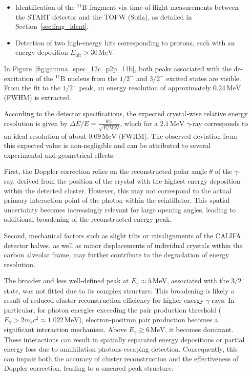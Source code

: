 \begin{itemize}
  \item Identification of the $^{11}\mathrm{B}$ fragment via time-of-flight measurements between the START detector and the TOFW (Sofia), as detailed in Section~\ref{sec:frag_ident}.
  \item Detection of two high-energy hits corresponding to protons, each with an energy deposition $E_{\text{hit}} > 30\,\mathrm{MeV}$.
\end{itemize}
In Figure~\ref{fig:gamma_spec_12c_p2p_11b}, both peaks associated with the de-excitation of the $^{11}\mathrm{B}$ nucleus from the $1/2^-$ and $3/2^-$ excited states are visible. From the fit to the $1/2^-$ peak, an energy resolution of approximately $0.24\,\mathrm{MeV}$ (FWHM) is extracted.

According to the detector specifications, the expected crystal-wise relative energy resolution is given by \(\Delta E / E = \frac{6\%}{\sqrt{E/\mathrm{MeV}}}\), which for a $2.1\,\mathrm{MeV}$ $\gamma$-ray corresponds to an ideal resolution of about $0.09\,\mathrm{MeV}$ (FWHM). The observed deviation from this expected value is non-negligible and can be attributed to several experimental and geometrical effects.

First, the Doppler correction relies on the reconstructed polar angle $\theta$ of the $\gamma$-ray, derived from the position of the crystal with the highest energy deposition within the detected cluster. However, this may not correspond to the actual primary interaction point of the photon within the scintillator. This spatial uncertainty becomes increasingly relevant for large opening angles, leading to additional broadening of the reconstructed energy peak.

Second, mechanical factors such as slight tilts or misalignments of the CALIFA detector halves, as well as minor displacements of individual crystals within the carbon alveolar frame, may further contribute to the degradation of energy resolution.

The broader and less well-defined peak at $E_{\gamma} \approx 5\,\mathrm{MeV}$, associated with the $3/2^-$ state, was not fitted due to its complex structure. This broadening is likely a result of reduced cluster reconstruction efficiency for higher-energy $\gamma$-rays. In particular, for photon energies exceeding the pair production threshold (\(E_{\gamma} > 2 m_e c^2 \approx 1.022\,\mathrm{MeV}\)), electron-positron pair production becomes a significant interaction mechanism. Above \(E_{\gamma} \gtrsim 6\,\mathrm{MeV}\), it becomes dominant. These interactions can result in spatially separated energy depositions or partial energy loss due to annihilation photons escaping detection. Consequently, this can impair both the accuracy of cluster reconstruction and the effectiveness of Doppler correction, leading to a smeared peak structure.

